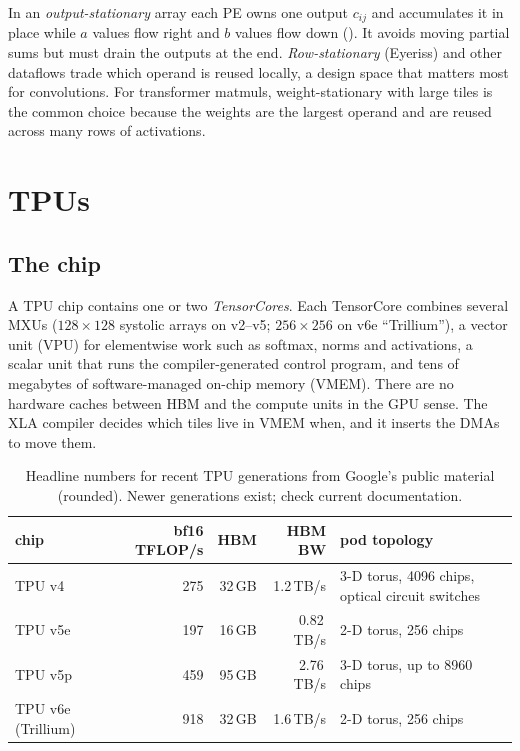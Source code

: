 \begin{deepdive}
In an \emph{output-stationary} array each PE owns one output $c_{ij}$ and accumulates it in
place while $a$ values flow right and $b$ values flow down ().
It avoids moving partial sums but must drain the outputs at the end. \emph{Row-stationary}
(Eyeriss) and other dataflows trade which operand is reused locally, a design space that matters
most for convolutions. For transformer matmuls, weight-stationary with large tiles is the
common choice because the weights are the largest operand and are reused across many rows of
activations.
\end{deepdive}

\section{TPUs}\label{sec:accel:tpu}

\subsection{The chip}

A TPU chip contains one or two \emph{TensorCores}. Each TensorCore combines several MXUs
($128\times128$ systolic arrays on v2--v5; $256\times256$ on v6e ``Trillium''), a vector unit (VPU) for
elementwise work such as softmax, norms and activations, a scalar unit that runs the
compiler-generated control program, and tens of megabytes of software-managed on-chip memory (VMEM).
There are no hardware caches between HBM and the compute units in the GPU sense. The XLA compiler
decides which tiles live in VMEM when, and it inserts the DMAs to move them.

\begin{table}[t]
\centering\small
\begin{tabular}{lrrrl}
\toprule
chip & bf16 TFLOP/s & HBM & HBM BW & pod topology\\
\midrule
TPU v4 & 275 & 32\,GB & 1.2\,TB/s & 3-D torus, 4096 chips, optical circuit switches\\
TPU v5e & 197 & 16\,GB & 0.82\,TB/s & 2-D torus, 256 chips\\
TPU v5p & 459 & 95\,GB & 2.76\,TB/s & 3-D torus, up to 8960 chips\\
TPU v6e (Trillium) & 918 & 32\,GB & 1.6\,TB/s & 2-D torus, 256 chips\\
\bottomrule
\end{tabular}
\caption{Headline numbers for recent TPU generations from Google's public material (rounded). Newer
generations exist; check current documentation.}
\label{tab:accel:tpu}
\end{table}

